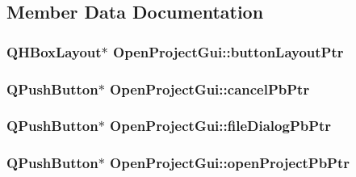 \subsection{Member Data Documentation}
\hypertarget{class_open_project_gui_abefeff15278c7240eaa8778d15ec21d7}{
\subsubsection[{button\-Layout\-Ptr}]{\setlength{\rightskip}{0pt plus 5cm}Q\-H\-Box\-Layout$\ast$ Open\-Project\-Gui\-::button\-Layout\-Ptr\hspace{0.3cm}{\ttfamily [private]}}}\label{class_open_project_gui_abefeff15278c7240eaa8778d15ec21d7}
\hypertarget{class_open_project_gui_a9e9fc184375d14b4ed336470bc06ffb1}{
\subsubsection[{cancel\-Pb\-Ptr}]{\setlength{\rightskip}{0pt plus 5cm}Q\-Push\-Button$\ast$ Open\-Project\-Gui\-::cancel\-Pb\-Ptr\hspace{0.3cm}{\ttfamily [private]}}}\label{class_open_project_gui_a9e9fc184375d14b4ed336470bc06ffb1}
\hypertarget{class_open_project_gui_affa5359b9b61f58f2b6681e5f0d0b243}{
\subsubsection[{file\-Dialog\-Pb\-Ptr}]{\setlength{\rightskip}{0pt plus 5cm}Q\-Push\-Button$\ast$ Open\-Project\-Gui\-::file\-Dialog\-Pb\-Ptr\hspace{0.3cm}{\ttfamily [private]}}}\label{class_open_project_gui_affa5359b9b61f58f2b6681e5f0d0b243}
\hypertarget{class_open_project_gui_a4eeebb540cd48483c353106938c97ea3}{
\subsubsection[{open\-Project\-Pb\-Ptr}]{\setlength{\rightskip}{0pt plus 5cm}Q\-Push\-Button$\ast$ Open\-Project\-Gui\-::open\-Project\-Pb\-Ptr\hspace{0.3cm}{\ttfamily [private]}}}\label{class_open_project_gui_a4eeebb540cd48483c353106938c97ea3}
